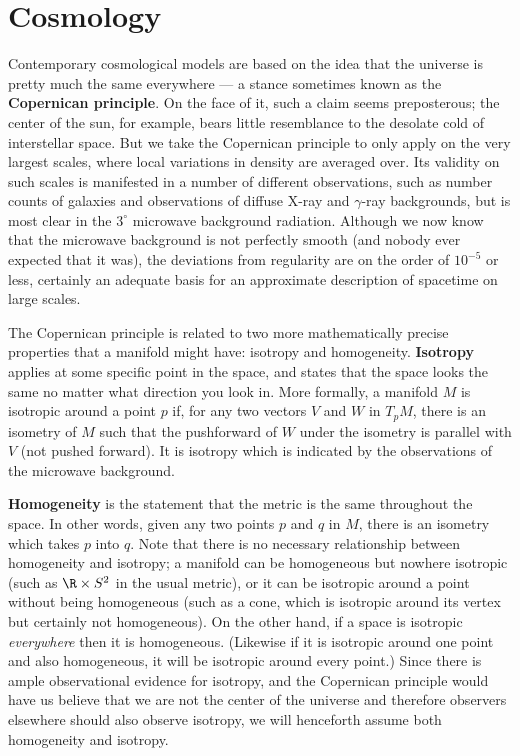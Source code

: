 \setcounter{section}{7}
\section{Cosmology}

Contemporary cosmological models are based on the idea that the
universe is pretty much the same everywhere --- a stance sometimes
known as the {\bf Copernican principle}.  On the face of it, such
a claim seems preposterous; the center of the sun, for example, 
bears little resemblance to the desolate cold of interstellar
space.  But we take the Copernican principle to only apply on
the very largest scales, where local variations in density are
averaged over.  Its validity on such scales is 
manifested in a number of different observations, such as number counts
of galaxies and observations of diffuse X-ray and $\gamma$-ray
backgrounds, but is most clear in the $3^\circ$ microwave background
radiation.  Although we now know that the microwave background is not
perfectly smooth (and nobody ever expected that it was), the 
deviations from regularity are on the order of $10^{-5}$ or less,
certainly an adequate basis for an approximate description of 
spacetime on large scales.

The Copernican principle is related to two more mathematically
precise properties that a manifold might have: isotropy and homogeneity.
{\bf Isotropy} applies at some specific point in the space, and
states that the space looks the same no matter what direction you
look in.  More formally, a manifold $M$ is isotropic around a point
$p$ if, for any two vectors $V$ and $W$ in $T_pM$, there is an
isometry of $M$ such that the pushforward of $W$ under the isometry
is parallel with $V$ (not pushed forward).
It is isotropy which is indicated by the observations of the
microwave background.

{\bf Homogeneity} is the statement that the metric is the same
throughout the space.  In other words, given any two points $p$ and
$q$ in $M$, there is an isometry which takes $p$ into $q$.
Note that there is no necessary relationship between homogeneity
and isotropy; a manifold can be homogeneous but nowhere isotropic
(such as $\R\times S^2$ in the usual metric), or it can be isotropic
around a point without being homogeneous (such as a cone, which is
isotropic around its vertex but certainly not homogeneous).  On the
other hand, if a space is isotropic {\it everywhere} then it is
homogeneous.  (Likewise if it is isotropic around one point and
also homogeneous, it will be isotropic around every point.)
Since there is ample observational evidence for 
isotropy, and the Copernican principle would have us believe that we
are not the center of the universe and therefore observers elsewhere
should also observe isotropy, we will henceforth assume both
homogeneity and isotropy.

